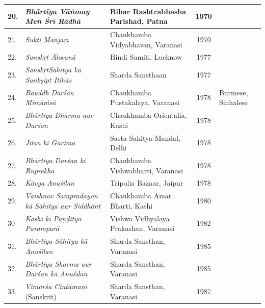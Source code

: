 \begin{longtable}{|l|p{2.9cm}|p{1.8cm}|c|p{1.6cm}|}
\hline
20. & \textit{Bhārtīya Vāṅmay Men Śrī Rādhā} & Bihar Rashtrabhasha Parishad, Patna & 1970 &   \\
\hline
21. & \textit{Sūkti Mañjarī} & Chaukhamba Vidyabhavan, Varanasi & 1970 &   \\
\hline
22. & \textit{Sanskṛt Ālocanā} & Hindi Samiti, Lucknow & 1977 &   \\
\hline
23. & \textit{SanskṛtSāhitya kā Saṅkṣipt Itihās} & Sharda Sansthaan & 1977 &   \\
\hline
24. & \textit{Bauddh Darśan Mīmāṁsā} & Chaukhamba Pustakalaya, Varanasi & 1978 & Burmese, Sinhalese \\
\hline
25. & \textit{Bhārtiya Dharma aur Darśan} & Chaukhamba Orientalia, Kashi & 1978 &   \\
\hline
26. & \textit{Jñān ki Garimā} & Sasta Sahitya Mandal, Delhi & 1978 &   \\
\hline
27. & \textit{Bhārtiya Darśan ki Rūprekhā} & Chaukhamba Vishwabharti, Varanasi & 1978 &   \\
\hline
28. & \textit{Kāvya Anuśīlan} & Tripolia Bazaar, Jaipur & 1978 &   \\
\hline
29. & \textit{Vaishnav Sampradāyon kā Sāhitya aur Siddhānt} & Chaukhamba Amar Bharti, Kashi & 1980 &   \\
\hline
30 & \textit{Kāshi kī Pāṇḍitya Paramparā} & Vishwa Vidhyalaya Prakashan, Varanasi & 1982 &   \\
\hline
31. & \textit{Bhārtiya Sāhitya kā Anuśīlan} & Sharda Sansthan, Varanasi & 1985 &   \\
\hline
32. & \textit{Bhārtiya Sharma aur Darśan kā Anuśīlan} & Sharda Sansthan, Varanasi & 1985 &   \\
\hline
33. & \textit{Vimarśa Cintāmaṇi} (Sanskrit) & Sharda Sansthan, Varanasi & 1987 &   \\
\hline
\end{longtable}

\theendnotes

